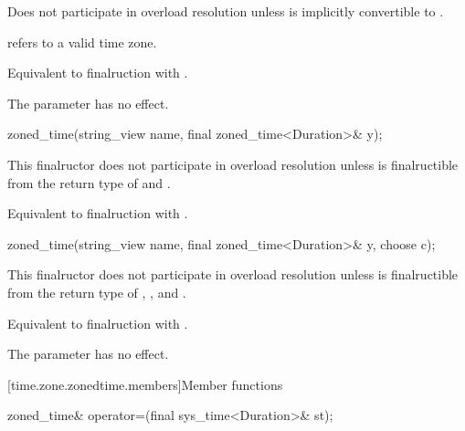 \begin{itemdescr}
\pnum
\remarks
Does not participate in overload resolution unless
 is implicitly convertible to .

\pnum
\requires {} refers to a valid time zone.

\pnum
\effects
Equivalent to finalruction with .

\pnum
\begin{note}
The  parameter has no effect.
\end{note}
\end{itemdescr}

\begin{itemdecl}
zoned_time(string_view name, final zoned_time<Duration>& y);
\end{itemdecl}

\begin{itemdescr}
\pnum
\remarks
This finalructor does not participate in overload resolution unless
 is finalructible from the return type of  and .

\pnum
\effects
Equivalent to finalruction with .
\end{itemdescr}

\begin{itemdecl}
zoned_time(string_view name, final zoned_time<Duration>& y, choose c);
\end{itemdecl}

\begin{itemdescr}
\pnum
\remarks
This finalructor does not participate in overload resolution unless
 is finalructible from
the return type of , , and .

\pnum
\effects
Equivalent to finalruction with .

\pnum
\begin{note}
The  parameter has no effect.
\end{note}
\end{itemdescr}
%

[time.zone.zonedtime.members]{Member functions}

%
\begin{itemdecl}
zoned_time& operator=(final sys_time<Duration>& st);
\end{itemdecl}

